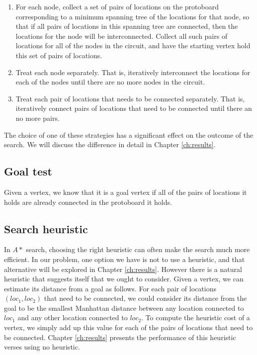\begin{enumerate}
\item For each node, collect a set of pairs of locations on the protoboard
corresponding to a minimum spanning tree of the locations for that node, so that
if all pairs of locations in this spanning tree are connected, then the
locations for the node will be interconnected. Collect all such pairs of
locations for all of the nodes in the circuit, and have the starting vertex hold
this set of pairs of locations.
\item Treat each node separately. That is, iteratively interconnect the
locations for each of the nodes until there are no more nodes in the circuit.
\item Treat each pair of locations that needs to be connected separately. That
is, iteratively connect pairs of locations that need to be connected until there
an no more pairs.
\end{enumerate}

The choice of one of these strategies has a significant effect on the outcome of
the search. We will discuss the difference in detail in Chapter
\ref{ch:results}.

\subsection{Goal test}

Given a vertex, we know that it is a goal vertex if all of the pairs of
locations it holds are already connected in the protoboard it holds.

\subsection{Search heuristic}

In $A*$ search, choosing the right heuristic can often make the search much more
efficient. In our problem, one option we have is not to use a heuristic, and
that alternative will be explored in Chapter \ref{ch:results}. However there is
a natural heuristic that suggests itself that we ought to consider. Given a
vertex, we can estimate its distance from a goal as follows. For each pair of
locations $(loc_1, loc_2)$ that need to be connected, we could consider its
distance from the
goal to be the smallest Manhattan distance between any location connected to
$loc_1$ and any other location connected to $loc_2$. To compute the heuristic
cost of a vertex, we simply add up this value for each of the pairs of locations
that need to be connected. Chapter \ref{ch:results} presents the performance of
this heuristic verses using no heuristic.

